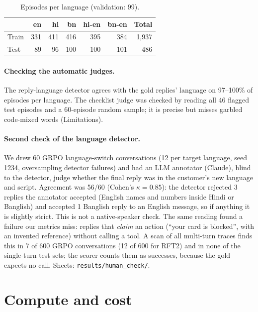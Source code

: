 \documentclass[11pt]{article}
\begin{document}
\begin{table}[h]
\centering
\small
\setlength{\tabcolsep}{3pt}
\begin{tabular}{lrrrrrr}
\toprule
 & en & hi & bn & hi-en & bn-en & Total \\
\midrule
Train & 331 & 411 & 416 & 395 & 384 & 1,937 \\
Test & 89 & 96 & 100 & 100 & 101 & 486 \\
\bottomrule
\end{tabular}
\caption{Episodes per language (validation: 99).}
\label{tab:splits}
\end{table}

\paragraph{Checking the automatic judges.} The reply-language detector agrees with the gold replies' language on
97--100\% of episodes per language. The checklist judge was checked by reading all 46 flagged test episodes and a
60-episode random sample; it is precise but misses garbled code-mixed words (Limitations).

\paragraph{Second check of the language detector.} We drew 60 GRPO language-switch conversations (12 per target
language, seed 1234, oversampling detector failures) and had an LLM annotator (Claude), blind to the detector, judge
whether the final reply was in the customer's new language and script. Agreement was 56/60 (Cohen's $\kappa=0.85$):
the detector rejected 3 replies the annotator accepted (English names and numbers inside Hindi or Banglish) and
accepted 1 Banglish reply to an English message, so if anything it is slightly strict. This is not a native-speaker
check. The same reading found a failure our metrics miss: replies that \emph{claim} an action (``your card is
blocked'', with an invented reference) without calling a tool. A scan of all multi-turn traces finds this in 7 of 600
GRPO conversations (12 of 600 for RFT2) and in none of the single-turn test sets; the scorer counts them as
successes, because the gold expects no call. Sheets: \texttt{results/human\_check/}.

\section{Compute and cost}
\end{document}
